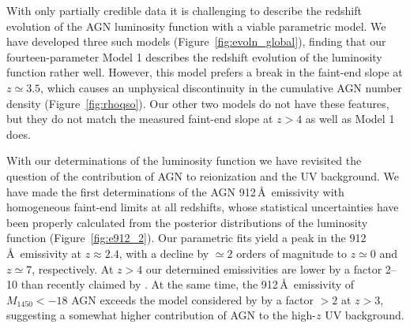\documentclass[fleqn,usenatbib]{mnras}
\begin{document}
With only partially credible data it is challenging to describe the
redshift evolution of the AGN luminosity function with a viable
parametric model.  We have developed three such models
(Figure~\ref{fig:evoln_global}), finding that our fourteen-parameter
Model 1 describes the redshift evolution of the luminosity function
rather well.  However, this model prefers a break in the faint-end
slope at $z\simeq 3.5$, which causes an unphysical discontinuity in
the cumulative AGN number density (Figure~\ref{fig:rhoqso}).  Our
other two models do not have these features, but they do not match the
measured faint-end slope at $z>4$ as well as Model 1 does.

With our determinations of the luminosity function we have revisited
the question of the contribution of AGN to reionization and the UV
background.  We have made the first determinations of the AGN
912\,\AA\ emissivity with homogeneous faint-end limits at all
redshifts, whose statistical uncertainties have been properly
calculated from the posterior distributions of the luminosity function
(Figure~\ref{fig:e912_2}). Our parametric fits yield a peak in the
912\,\AA\ emissivity at $z\approx 2.4$, with a decline by $\simeq 2$
orders of magnitude to $z\simeq 0$ and $z\simeq 7$, respectively. At
$z>4$ our determined emissivities are lower by a factor 2--10 than
recently claimed by \citet{2015AA...578A..83G}. At the same time, the
912\,\AA\ emissivity of $M_{1450}<-18$ AGN exceeds the model
considered by \citet{2012ApJ...746..125H} by a factor $>2$ at $z>3$,
suggesting a somewhat higher contribution of AGN to the high-$z$ UV
background.
\end{document}
